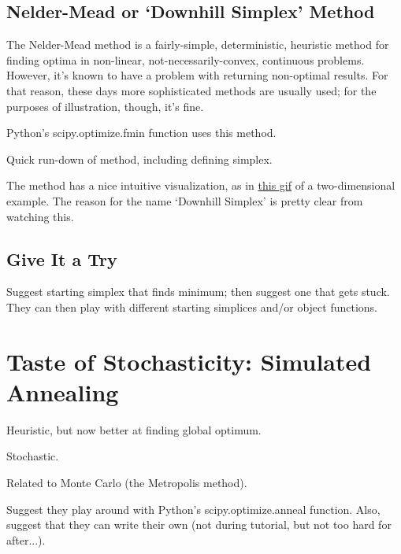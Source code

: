 \documentclass{article}
\begin{document}
	\subsection*{Nelder-Mead or `Downhill Simplex' Method}
		The Nelder-Mead method is a fairly-simple, deterministic, heuristic method
		for finding optima in non-linear, not-necessarily-convex, continuous problems.
		However, it's known to have
		a problem with returning non-optimal results. For that reason,
		these days more sophisticated methods are usually used; for
		the purposes of illustration, though, it's fine.

		Python's scipy.optimize.fmin function uses this method.

		Quick run-down of method, including defining simplex.

		The method has a nice intuitive visualization, as in 
		\href{http://userpages.umbc.edu/~rostamia/nelder-mead.html}{this gif}
		of a two-dimensional example. The reason for the name
		`Downhill Simplex' is pretty clear from watching this.

	\subsection*{Give It a Try}
		Suggest starting simplex that finds minimum; then
		suggest one that gets stuck. They can then play
		with different starting simplices and/or object functions.

\section*{Taste of Stochasticity: Simulated Annealing}
  Heuristic, but now better at finding
  global optimum.

	Stochastic.

  Related to Monte Carlo (the Metropolis method).

  Suggest they play around with Python's scipy.optimize.anneal function.
  Also, suggest that they can write their own (not during tutorial,
  but not too hard for after...).
\end{document}
